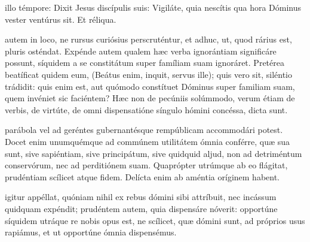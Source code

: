 \documentclass[fontsize=9pt,paper=A6,twoside,BCOR=1mm,DIV=22,headinclude]{scrarticle}
\begin{document}
\begin{multicols}{2}





 illo témpore: Dixit Jesus discípulis suis: Vigiláte, quia nescítis qua hora Dóminus vester ventúrus sit. Et réliqua.

 autem in loco, ne rursus curiósius perscruténtur, et adhuc, ut, quod rárius est, pluris osténdat.
Expénde autem qualem hæc verba ignorántiam significáre possunt, síquidem a se constitátum super famíliam suam ignoráret. Pretérea beatíficat quidem eum, (Beátus enim, inquit, servus ille); quis vero sit, siléntio trádidit: quis enim est, aut quómodo constítuet Dóminus super familiam suam, quem invéniet sic faciéntem? Hæc non de pecúniis solúmmodo, verum étiam de verbis, de virtúte, de omni dispensatióne síngulo hómini concéssa, dicta sunt.

\RVCPvii

 parábola vel ad geréntes gubernantésque rempúblicam accommodári potest. Docet enim unumquémque ad commúnem utilitátem ómnia conférre, quæ sua sunt, sive sapiéntiam, sive principátum, sive quidquid aljud, non ad detriméntum conservórum, nec ad perditiónem suam. Quaprópter utrúmque ab eo flágitat, prudéntiam scílicet
atque fidem. Delícta enim ab améntia oríginem habent.

\RVCPviii

{
 igitur appéllat, quóniam nihil ex rebus dómini sibi attríbuit, nec incássum quidquam expéndit; prudéntem autem, quia dispensáre nóverit: opportúne síquidem utráque re nobis opus est, ne scílicet, quæ dómini sunt, ad próprios usus rapiámus, et ut opportúne ómnia dispensémus.

\Te


}




\end{multicols}
\end{document}

